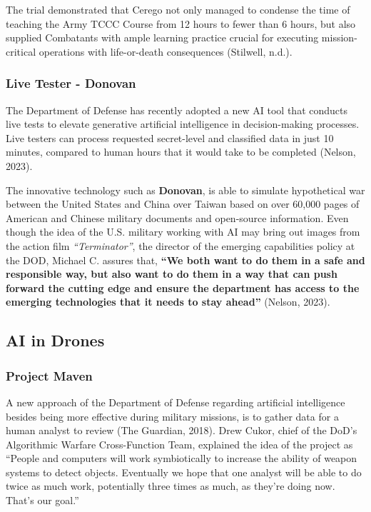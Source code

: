 \documentclass[
]{article}
\begin{document}
The trial demonstrated that Cerego not only managed to condense the time of teaching the Army TCCC Course from 12 hours to fewer than 6 hours, but also supplied Combatants with ample learning practice crucial for executing mission-critical operations with life-or-death consequences (Stilwell, n.d.).

\hypertarget{live-tester---donovan}{%
\subsubsection{Live Tester - Donovan}\label{live-tester---donovan}}

The Department of Defense has recently adopted a new AI tool that conducts live tests to elevate generative artificial intelligence in decision-making processes. Live testers can process requested secret-level and classified data in just 10 minutes, compared to human hours that it would take to be completed (Nelson, 2023).

The innovative technology such as \textbf{Donovan}, is able to simulate hypothetical war between the United States and China over Taiwan based on over 60,000 pages of American and Chinese military documents and open-source information. Even though the idea of the U.S. military working with AI may bring out images from the action film \emph{``Terminator''}, the director of the emerging capabilities policy at the DOD, Michael C. assures that, \textbf{``We both want to do them in a safe and responsible way, but also want to do them in a way that can push forward the cutting edge and ensure the department has access to the emerging technologies that it needs to stay ahead''} (Nelson, 2023).

\hypertarget{ai-in-drones}{%
\subsection{AI in Drones}\label{ai-in-drones}}

\hypertarget{project-maven}{%
\subsubsection{Project Maven}\label{project-maven}}

A new approach of the Department of Defense regarding artificial intelligence besides being more effective during military missions, is to gather data for a human analyst to review (The Guardian, 2018). Drew Cukor, chief of the DoD's Algorithmic Warfare Cross-Function Team, explained the idea of the project as ``People and computers will work symbiotically to increase the ability of weapon systems to detect objects. Eventually we hope that one analyst will be able to do twice as much work, potentially three times as much, as they're doing now. That's our goal.''
\end{document}
